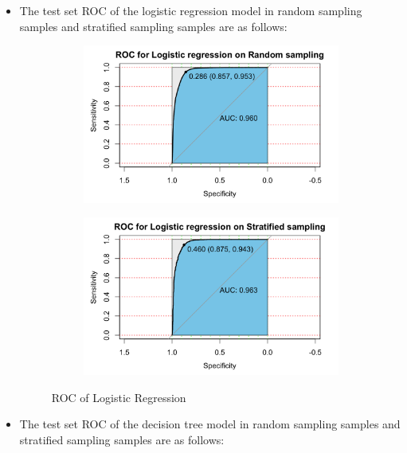 \documentclass[11pt]{article}
\begin{document}
\begin{itemize}
\item The test set ROC of the logistic regression model in random sampling samples and stratified sampling samples are as follows:
\begin{figure}[H]
  \centering
  \begin{subfigure}{.5\textwidth}
    \centering
      \includegraphics[width=1\textwidth, height=0.65\textwidth]{../figures/ROC_LR_random.png}    
  \end{subfigure}%
  \begin{subfigure}{.5\textwidth}
    \centering
      \includegraphics[width=1\textwidth, height=0.65\textwidth]{../figures/ROC_LR_s.png}
  \end{subfigure}%
  \caption{ROC of Logistic Regression}
\end{figure}
\item The test set ROC of the decision tree model in random sampling samples and stratified sampling samples are as follows:

\end{itemize}
\end{document}
